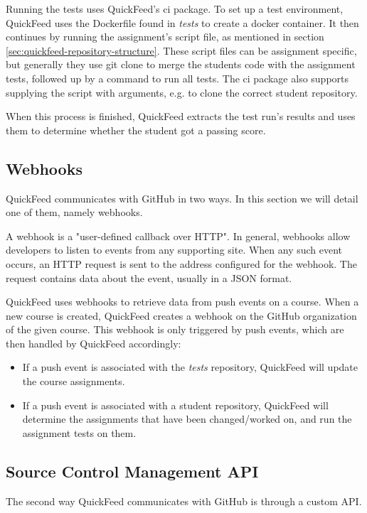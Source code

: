 Running the tests uses QuickFeed's ci package.
To set up a test environment, QuickFeed uses the Dockerfile found in \textit{tests} to create a docker container.
It then continues by running the assignment's script file, as mentioned in section \ref{sec:quickfeed-repository-structure}.
These script files can be assignment specific, but generally they use git clone to merge the students code with the assignment tests, followed up by a command to run all tests.
The ci package also supports supplying the script with arguments, e.g. to clone the correct student repository.

When this process is finished, QuickFeed extracts the test run's results and uses them to determine whether the student got a passing score.

\subsection{Webhooks}
\label{sec:webhooks}

QuickFeed communicates with GitHub in two ways.
In this section we will detail one of them, namely webhooks.

A webhook is a "user-defined callback over HTTP". %
In general, webhooks allow developers to listen to events from any supporting site.
When any such event occurs, an HTTP request is sent to the address configured for the webhook.
The request contains data about the event, usually in a JSON format.

QuickFeed uses webhooks to retrieve data from push events on a course.
When a new course is created, QuickFeed creates a webhook on the GitHub organization of the given course.
This webhook is only triggered by push events, which are then handled by QuickFeed accordingly:

\begin{itemize}
    \item If a push event is associated with the \textit{tests} repository, QuickFeed will update the course assignments.
    \item If a push event is associated with a student repository, QuickFeed will determine the assignments that have been changed/worked on, 
    and run the assignment tests on them.
\end{itemize}

\subsection{Source Control Management API}
The second way QuickFeed communicates with GitHub is through a custom API.

